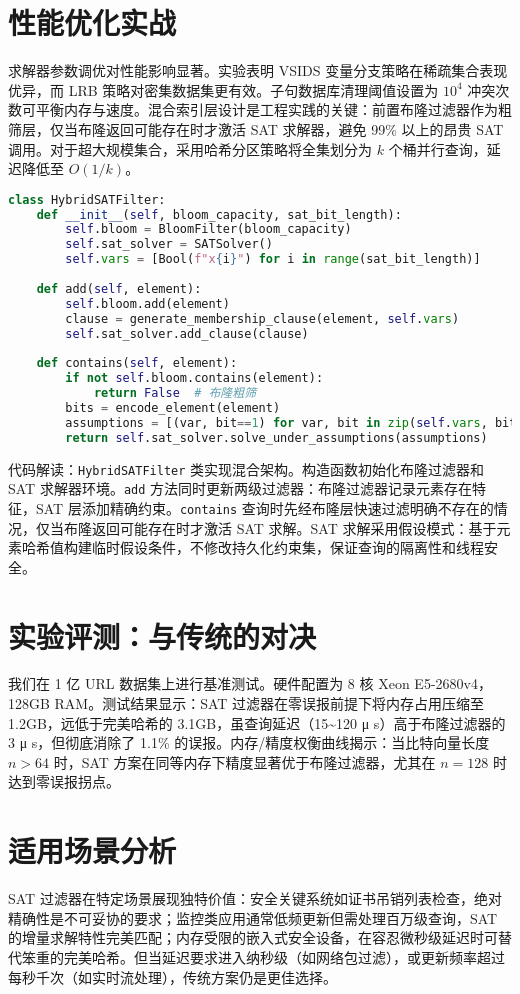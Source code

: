 \chapter{性能优化实战}
求解器参数调优对性能影响显著。实验表明 VSIDS 变量分支策略在稀疏集合表现优异，而 LRB 策略对密集数据集更有效。子句数据库清理阈值设置为 $10^4$ 冲突次数可平衡内存与速度。混合索引层设计是工程实践的关键：前置布隆过滤器作为粗筛层，仅当布隆返回可能存在时才激活 SAT 求解器，避免 99\%{} 以上的昂贵 SAT 调用。对于超大规模集合，采用哈希分区策略将全集划分为 $k$ 个桶并行查询，延迟降低至 $O(1/k)$。\par
\begin{lstlisting}[language=python]
class HybridSATFilter:
    def __init__(self, bloom_capacity, sat_bit_length):
        self.bloom = BloomFilter(bloom_capacity) 
        self.sat_solver = SATSolver()
        self.vars = [Bool(f"x{i}") for i in range(sat_bit_length)]
    
    def add(self, element):
        self.bloom.add(element)
        clause = generate_membership_clause(element, self.vars)
        self.sat_solver.add_clause(clause)
    
    def contains(self, element):
        if not self.bloom.contains(element): 
            return False  # 布隆粗筛
        bits = encode_element(element)
        assumptions = [(var, bit==1) for var, bit in zip(self.vars, bits)]
        return self.sat_solver.solve_under_assumptions(assumptions)
\end{lstlisting}
代码解读：\texttt{HybridSATFilter} 类实现混合架构。构造函数初始化布隆过滤器和 SAT 求解器环境。\texttt{add} 方法同时更新两级过滤器：布隆过滤器记录元素存在特征，SAT 层添加精确约束。\texttt{contains} 查询时先经布隆层快速过滤明确不存在的情况，仅当布隆返回可能存在时才激活 SAT 求解。SAT 求解采用假设模式：基于元素哈希值构建临时假设条件，不修改持久化约束集，保证查询的隔离性和线程安全。\par
\chapter{实验评测：与传统的对决}
我们在 1 亿 URL 数据集上进行基准测试。硬件配置为 8 核 Xeon E5-2680v4，128GB RAM。测试结果显示：SAT 过滤器在零误报前提下将内存占用压缩至 1.2GB，远低于完美哈希的 3.1GB，虽查询延迟（15\~{}120 μ s）高于布隆过滤器的 3 μ s，但彻底消除了 1.1\%{} 的误报。内存/精度权衡曲线揭示：当比特向量长度 $n > 64$ 时，SAT 方案在同等内存下精度显著优于布隆过滤器，尤其在 $n=128$ 时达到零误报拐点。\par
\chapter{适用场景分析}
SAT 过滤器在特定场景展现独特价值：安全关键系统如证书吊销列表检查，绝对精确性是不可妥协的要求；监控类应用通常低频更新但需处理百万级查询，SAT 的增量求解特性完美匹配；内存受限的嵌入式安全设备，在容忍微秒级延迟时可替代笨重的完美哈希。但当延迟要求进入纳秒级（如网络包过滤），或更新频率超过每秒千次（如实时流处理），传统方案仍是更佳选择。\par
